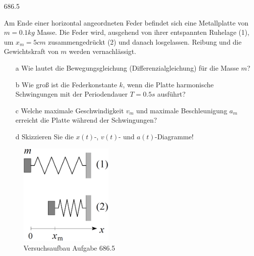 \begin{auf}
    686.5
\end{auf}
Am Ende einer horizontal angeordneten Feder befindet sich eine Metallplatte von $m=0.1kg$ Masse. Die Feder wird, ausgehend von ihrer entspannten Ruhelage (1), um $x_m=5cm$ zusammengedrückt (2) und danach losgelassen. Reibung und die Gewichtskraft von $m$ werden vernachlässigt.
\begin{enumerate}
    \item[a] Wie lautet die Bewegungsgleichung (Differenzialgleichung) für die Masse $m$?
    \item[b] Wie groß ist die Federkonstante $k$, wenn die Platte harmonische Schwingungen mit der Periodendauer $T=0.5s$ ausführt?
    \item[c] Welche maximale Geschwindigkeit $v_m$ und maximale Beschleunigung $a_m$ erreicht die Platte	während der Schwingungen?
    \item[d] Skizzieren Sie die $x(t)$-, $v(t)$- und $a(t)$-Diagramme!
\end{enumerate}
\begin{figure}[h]
    \centering
    \includegraphics[height=5cm]{images/686,5_0.png}
    \caption{Versuchsaufbau Aufgabe 686.5}
\end{figure}